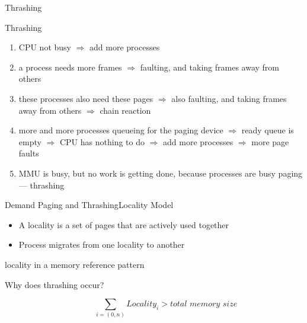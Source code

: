 \begin{frame}{Thrashing}
  \begin{center}
  \end{center}
\end{frame}

\begin{frame}{Thrashing}
  \begin{enumerate}
  \item CPU not busy $\Rightarrow$ add more processes
  \item a process needs more frames $\Rightarrow$ faulting, and taking frames away from
    others
  \item these processes also need these pages $\Rightarrow$ also faulting, and taking
    frames away from others $\Rightarrow$ chain reaction
  \item more and more processes queueing for the paging device $\Rightarrow$ ready queue
    is empty $\Rightarrow$ CPU has nothing to do $\Rightarrow$ add more processes
    $\Rightarrow$ more page faults
  \item MMU is busy, but no work is getting done, because processes are busy paging ---
    \alert{thrashing}
  \end{enumerate}
\end{frame}

\begin{frame}{Demand Paging and Thrashing}{Locality Model}
  \begin{minipage}{.5\textwidth}
    \begin{itemize}
    \item A \alert{locality} is a set of pages that are actively used together
    \item Process migrates from one locality to another
    \end{itemize}
  \end{minipage}\hfill
  \begin{minipage}{.4\textwidth}
    \begin{center}
       
      {\tiny locality in a memory reference pattern}
    \end{center}
  \end{minipage}
  
  \begin{description}
  \item[Why does thrashing occur?]
    \begin{small}
      $$\sum_{i=(0,n)}Locality_i > \textit{total memory size}$$
    \end{small}
  \end{description}
\end{frame}

